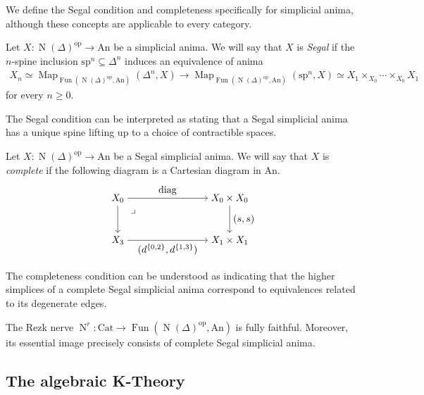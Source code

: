 \documentclass[a4paper,dvipdfmx,11pt,reqno]{amsart}
\DeclareMathOperator{\Map}{Map}
\DeclareMathOperator{\myop}{op}
\DeclareMathOperator{\N}{N}
\DeclareMathOperator{\Fun}{Fun}
\newcommand{\An}{\mathrm{An}}
\newcommand{\Cat}{\mathrm{Cat}}
\begin{document}
We define the Segal condition and completeness specifically for simplicial anima, although these concepts are applicable to every category.

\begin{definition}
  Let $X : \N(\Delta)^{\myop} \to \An$ be a simplicial anima.
  We will say that $X$ is \textit{Segal} if the $n$-spine inclusion $\mathrm{sp}^n \subseteq \Delta^n$ induces an equivalence of anima 
  \begin{align*}
    X_n \simeq \Map_{\Fun(\N(\Delta)^{\myop},\An)}(\Delta^n,X) \to \Map_{\Fun(\N(\Delta)^{\myop},\An)}(\mathrm{sp}^n,X) \simeq X_1 \times_{X_0} \cdots \times_{X_0} X_1
  \end{align*}
  for every $n \geq 0$.
\end{definition}

The Segal condition can be interpreted as stating that a Segal simplicial anima has a unique spine lifting up to a choice of contractible spaces.

\begin{definition}
  Let $X : \N(\Delta)^{\myop} \to \An$ be a Segal simplicial anima.
  We will say that $X$ is \textit{complete} if the following diagram is a Cartesian diagram in $\An$.
  \[\begin{tikzpicture}[auto,->] 
    \node (tl) at (0,1.5) {$X_0$}; 
    \node (tr) at (4,1.5) {$X_0 \times X_0$};
    \node (bl) at (0,0) {$X_3$}; 
    \node (br) at (4,0) {$X_1 \times X_1$}; 
    \draw (tl) -- node {$\mathrm{diag}$} (tr); 
    \draw (bl) -- node[swap] {$(d^{\{0,2\}},d^{\{1,3\}})$} (br); 
    \draw (tl) -- node[swap] {} (bl);
    \draw (tr) -- node {$(s,s)$} (br); 
    \node at ([xshift=0.2cm, yshift=-0.2cm] tl.south east) {$\lrcorner$};
  \end{tikzpicture}\]
\end{definition}

The completeness condition can be understood as indicating that the higher simplices of a complete Segal simplicial anima correspond to equivalences related to its degenerate edges.

\begin{proposition}
  The Rezk nerve $\N^r : \Cat \to \Fun(\N(\Delta)^{\myop},\An)$ is fully faithful.
  Moreover, its essential image precisely consists of complete Segal simplicial anima.
\end{proposition}

\subsection{The algebraic K-Theory}
\end{document}
